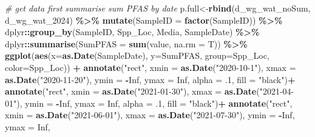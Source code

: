 \documentclass[
]{article}
\newenvironment{Shaded}{\begin{snugshade}}{\end{snugshade}}
\newcommand{\AttributeTok}[1]{\textcolor[rgb]{0.13,0.29,0.53}{#1}}
\newcommand{\CommentTok}[1]{\textcolor[rgb]{0.56,0.35,0.01}{\textit{#1}}}
\newcommand{\ConstantTok}[1]{\textcolor[rgb]{0.56,0.35,0.01}{#1}}
\newcommand{\DecValTok}[1]{\textcolor[rgb]{0.00,0.00,0.81}{#1}}
\newcommand{\FunctionTok}[1]{\textcolor[rgb]{0.13,0.29,0.53}{\textbf{#1}}}
\newcommand{\NormalTok}[1]{#1}
\newcommand{\OtherTok}[1]{\textcolor[rgb]{0.56,0.35,0.01}{#1}}
\newcommand{\SpecialCharTok}[1]{\textcolor[rgb]{0.81,0.36,0.00}{\textbf{#1}}}
\newcommand{\StringTok}[1]{\textcolor[rgb]{0.31,0.60,0.02}{#1}}
\begin{document}
\begin{Shaded}
\begin{Highlighting}[]
\CommentTok{\# get data first summarise sum PFAS by date}
\NormalTok{p.full}\OtherTok{\textless{}{-}}\FunctionTok{rbind}\NormalTok{(d\_wg\_wat\_noSum, d\_wg\_wat\_2024) }\SpecialCharTok{\%\textgreater{}\%} 
  \FunctionTok{mutate}\NormalTok{(}\AttributeTok{SampleID =} \FunctionTok{factor}\NormalTok{(SampleID)) }\SpecialCharTok{\%\textgreater{}\%} 
\NormalTok{  dplyr}\SpecialCharTok{::}\FunctionTok{group\_by}\NormalTok{(SampleID, Spp\_Loc, Media, SampleDate) }\SpecialCharTok{\%\textgreater{}\%} 
\NormalTok{  dplyr}\SpecialCharTok{::}\FunctionTok{summarise}\NormalTok{(}\AttributeTok{SumPFAS =} \FunctionTok{sum}\NormalTok{(value, }\AttributeTok{na.rm =}\NormalTok{ T)) }\SpecialCharTok{\%\textgreater{}\%} 
  \FunctionTok{ggplot}\NormalTok{(}\FunctionTok{aes}\NormalTok{(}\AttributeTok{x=}\FunctionTok{as.Date}\NormalTok{(SampleDate), }\AttributeTok{y=}\NormalTok{SumPFAS, }\AttributeTok{group=}\NormalTok{Spp\_Loc, }\AttributeTok{color=}\NormalTok{Spp\_Loc)) }\SpecialCharTok{+}
    \FunctionTok{annotate}\NormalTok{(}\StringTok{"rect"}\NormalTok{, }\AttributeTok{xmin =} \FunctionTok{as.Date}\NormalTok{(}\StringTok{"2020{-}10{-}1"}\NormalTok{), }\AttributeTok{xmax =} \FunctionTok{as.Date}\NormalTok{(}\StringTok{"2020{-}11{-}20"}\NormalTok{),}
             \AttributeTok{ymin =} \SpecialCharTok{{-}}\ConstantTok{Inf}\NormalTok{, }\AttributeTok{ymax =} \ConstantTok{Inf}\NormalTok{,}
             \AttributeTok{alpha =}\NormalTok{ .}\DecValTok{1}\NormalTok{, }\AttributeTok{fill =} \StringTok{"black"}\NormalTok{)}\SpecialCharTok{+}
    \FunctionTok{annotate}\NormalTok{(}\StringTok{"rect"}\NormalTok{, }\AttributeTok{xmin =} \FunctionTok{as.Date}\NormalTok{(}\StringTok{"2021{-}01{-}30"}\NormalTok{), }\AttributeTok{xmax =} \FunctionTok{as.Date}\NormalTok{(}\StringTok{"2021{-}04{-}01"}\NormalTok{),}
             \AttributeTok{ymin =} \SpecialCharTok{{-}}\ConstantTok{Inf}\NormalTok{, }\AttributeTok{ymax =} \ConstantTok{Inf}\NormalTok{,}
             \AttributeTok{alpha =}\NormalTok{ .}\DecValTok{1}\NormalTok{, }\AttributeTok{fill =} \StringTok{"black"}\NormalTok{)}\SpecialCharTok{+}
    \FunctionTok{annotate}\NormalTok{(}\StringTok{"rect"}\NormalTok{, }\AttributeTok{xmin =} \FunctionTok{as.Date}\NormalTok{(}\StringTok{"2021{-}06{-}01"}\NormalTok{), }\AttributeTok{xmax =} \FunctionTok{as.Date}\NormalTok{(}\StringTok{"2021{-}07{-}30"}\NormalTok{),}
             \AttributeTok{ymin =} \SpecialCharTok{{-}}\ConstantTok{Inf}\NormalTok{, }\AttributeTok{ymax =} \ConstantTok{Inf}\NormalTok{,}

\end{Highlighting}
\end{Shaded}
\end{document}

